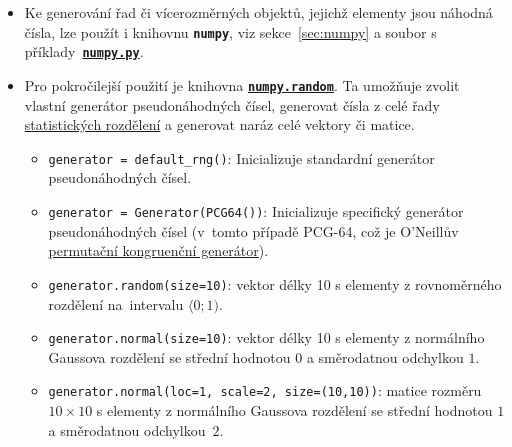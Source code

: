 \documentclass[a4paper,11pt,twoside]{article}
\def\code#1{\textnormal{\texttt{#1}}}
\def\file#1{\textnormal{\textbf{\texttt{#1}}}}
\def\ghfile#1#2{\textnormal{\textbf{\texttt{\href{https://github.com/PavelStransky/PCInPhysics/blob/main/#1#2}{#2}}}}}
\theoremstyle{red}
\theoremstyle{green}
\begin{document}
\begin{itemize}
        \item
            Ke generování řad či vícerozměrných objektů, jejichž elementy jsou náhodná čísla, lze použít i knihovnu \file{numpy}, viz sekce~\ref{sec:numpy} a soubor s příklady~\ghfile{python/basics/}{numpy.py}.

        \item 
            Pro pokročilejší použití je knihovna \file{\href{https://numpy.org/doc/stable/reference/random/index.html}{numpy.random}}.
            Ta umožňuje zvolit vlastní generátor pseudonáhodných čísel, generovat čísla z celé řady \href{https://numpy.org/doc/stable/reference/random/generator.html}{statistických rozdělení} a generovat naráz celé vektory či matice.
            \begin{itemize}
                \item \code{generator = default_rng()}: Inicializuje standardní generátor pseudonáhodných čísel.
                \item \code{generator = Generator(PCG64())}: Inicializuje specifický generátor pseudonáhodných čísel (v~tomto případě PCG-64, což je O'Neillův \href{https://en.wikipedia.org/wiki/Permuted_congruential_generator}{permutační kongruenční generátor}).
                \item \code{generator.random(size=10)}: vektor délky 10 s elementy z rovnoměrného rozdělení na~intervalu $\langle 0;1)$.
                \item \code{generator.normal(size=10)}: vektor délky 10 s elementy z normálního Gaussova rozdělení se střední hodnotou $0$ a směrodatnou odchylkou $1$.
                \item \code{generator.normal(loc=1, scale=2, size=(10,10))}: matice rozměru $10\times10$ s elementy z normálního Gaussova rozdělení se střední hodnotou $1$ a směrodatnou odchylkou~$2$.
            \end{itemize}            
    \end{itemize}
\end{document}
